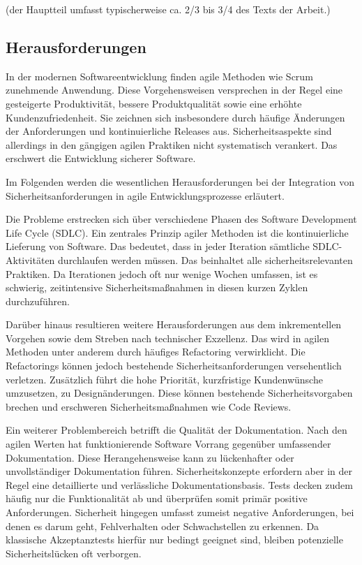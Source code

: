 \documentclass[acmtog]{acmart}
\begin{document}
(der Hauptteil umfasst typischerweise ca. 2/3 bis 3/4 des Texts der Arbeit.)

\subsection{Herausforderungen}
In der modernen Softwareentwicklung finden agile Methoden wie Scrum zunehmende Anwendung.
Diese Vorgehensweisen versprechen in der Regel eine gesteigerte Produktivität, bessere Produktqualität sowie eine erhöhte Kundenzufriedenheit. 
Sie zeichnen sich insbesondere durch häufige Änderungen der Anforderungen und kontinuierliche Releases aus.
Sicherheitsaspekte sind allerdings in den gängigen agilen Praktiken nicht systematisch verankert. Das erschwert die Entwicklung sicherer Software. \cite{oueslati_literature_2015}

Im Folgenden werden die wesentlichen Herausforderungen bei der Integration von Sicherheitsanforderungen in agile Entwicklungsprozesse erläutert. 

Die Probleme erstrecken sich über verschiedene Phasen des Software Development Life Cycle (SDLC).
Ein zentrales Prinzip agiler Methoden ist die kontinuierliche Lieferung von Software. 
Das bedeutet, dass in jeder Iteration sämtliche SDLC-Aktivitäten durchlaufen werden müssen.
Das beinhaltet alle sicherheitsrelevanten Praktiken. 
Da Iterationen jedoch oft nur wenige Wochen umfassen, ist es schwierig, zeitintensive Sicherheitsmaßnahmen in diesen kurzen Zyklen durchzuführen. \cite{oueslati_literature_2015}

Darüber hinaus resultieren weitere Herausforderungen aus dem inkrementellen Vorgehen sowie dem Streben nach technischer Exzellenz. 
Das wird in agilen Methoden unter anderem durch häufiges Refactoring verwirklicht. 
Die Refactorings können jedoch bestehende Sicherheitsanforderungen versehentlich verletzen. 
Zusätzlich führt die hohe Priorität, kurzfristige Kundenwünsche umzusetzen, zu Designänderungen.
Diese können bestehende Sicherheitsvorgaben brechen und erschweren Sicherheitsmaßnahmen wie Code Reviews. \cite{oueslati_literature_2015}

Ein weiterer Problembereich betrifft die Qualität der Dokumentation.
Nach den agilen Werten hat funktionierende Software Vorrang gegenüber umfassender Dokumentation. 
Diese Herangehensweise kann zu lückenhafter oder unvollständiger Dokumentation führen.
Sicherheitskonzepte erfordern aber in der Regel eine detaillierte und verlässliche Dokumentationsbasis.
Tests decken zudem häufig nur die Funktionalität ab und überprüfen somit primär positive Anforderungen.
Sicherheit hingegen umfasst zumeist negative Anforderungen, bei denen es darum geht, Fehlverhalten oder Schwachstellen zu erkennen.
Da klassische Akzeptanztests hierfür nur bedingt geeignet sind, bleiben potenzielle Sicherheitslücken oft verborgen. \cite{oueslati_literature_2015}
\end{document}
